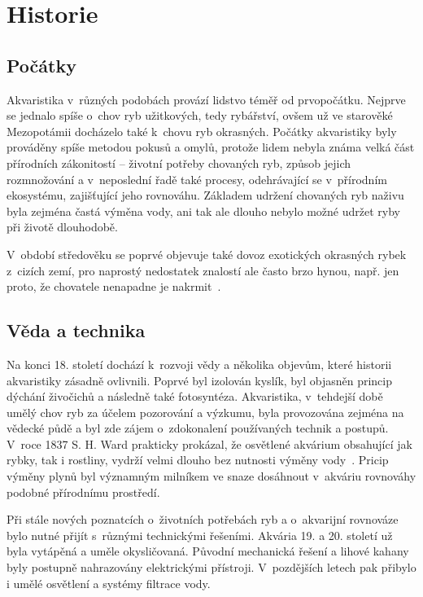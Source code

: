 \section{Historie}
\subsection{Počátky}
Akvaristika v~různých podobách provází lidstvo téměř od prvopočátku. Nejprve se jednalo spíše o~chov ryb užitkových, tedy rybářství, ovšem už ve starověké Mezopotámii docházelo také k~chovu ryb okrasných. Počátky akvaristiky byly prováděny spíše metodou pokusů a omylů, protože lidem nebyla známa velká část přírodních zákonitostí -- životní potřeby chovaných ryb, způsob jejich rozmnožování a v~neposlední řadě také procesy, odehrávající se v~přírodním ekosystému, zajišťující jeho rovnováhu. Základem udržení chovaných ryb naživu byla zejména častá výměna vody, ani tak ale dlouho nebylo možné udržet ryby při životě dlouhodobě. 

V~období středověku se poprvé objevuje také dovoz exotických okrasných rybek z~cizích zemí, pro naprostý nedostatek znalostí ale často brzo hynou, např. jen proto, že chovatele nenapadne je nakrmit~\cite{vitek_akvaristika}.

\subsection{Věda a technika}
Na konci 18. století dochází k~rozvoji vědy a několika objevům, které historii akvaristiky zásadně ovlivnili. Poprvé byl izolován kyslík, byl objasněn princip dýchání živočichů a následně také fotosyntéza. Akvaristika, v~tehdejší době umělý chov ryb za účelem pozorování a výzkumu, byla provozována zejména na vědecké půdě a byl zde zájem o~zdokonalení používaných technik a postupů. V~roce 1837 S. H. Ward prakticky prokázal, že osvětlené akvárium obsahující jak rybky, tak i rostliny, vydrží velmi dlouho bez nutnosti výměny vody~\cite{vitek_akvaristika}. Pricip výměny plynů byl významným milníkem ve snaze dosáhnout v~akváriu rovnováhy podobné přírodnímu prostředí. 

Při stále nových poznatcích o~životních potřebách ryb a o~akvarijní rovnováze bylo nutné přijít s~různými technickými řešeními. Akvária 19. a 20. století už byla vytápěná a uměle okysličovaná. Původní mechanická řešení a lihové kahany byly postupně nahrazovány elektrickými přístroji. V~pozdějších letech pak přibylo i umělé osvětlení a systémy filtrace vody. 